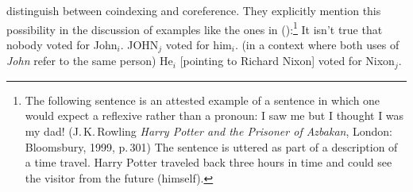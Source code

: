 \documentclass[output=paper
	        ,collection
	        ,collectionchapter
 	        ,biblatex
                ,babelshorthands
                ,newtxmath
                ,draftmode
                ,colorlinks, citecolor=brown
]{langscibook}
\begin{document}
\citet[]{ps2} distinguish between coindexing and coreference. They explicitly mention this
possibility in the discussion of examples like the ones in ():\footnote{
  The following sentence is an attested example of a sentence in which one would expect a reflexive
  rather than a pronoun:
        \ea
        I saw me but I thought I was my dad! (J.\,K.\,Rowling \emph{Harry Potter and the Prisoner of Azbakan}, London: Bloomsbury, 1999, p.\,301)
        \z
  The sentence is uttered as part of a description of a time travel. Harry Potter traveled back three hours in
  time and could see the visitor from the future (himself).
}
\eal
\ex It isn't true that nobody voted for John$_{i}$. JOHN$_{j}$ voted for him$_{i}$. 
        (in a context where both uses of \emph{John\/} refer to the same person)
\ex He$_{i}$ [pointing to Richard Nixon] voted for Nixon$_{j}$.
\zl
\end{document}
